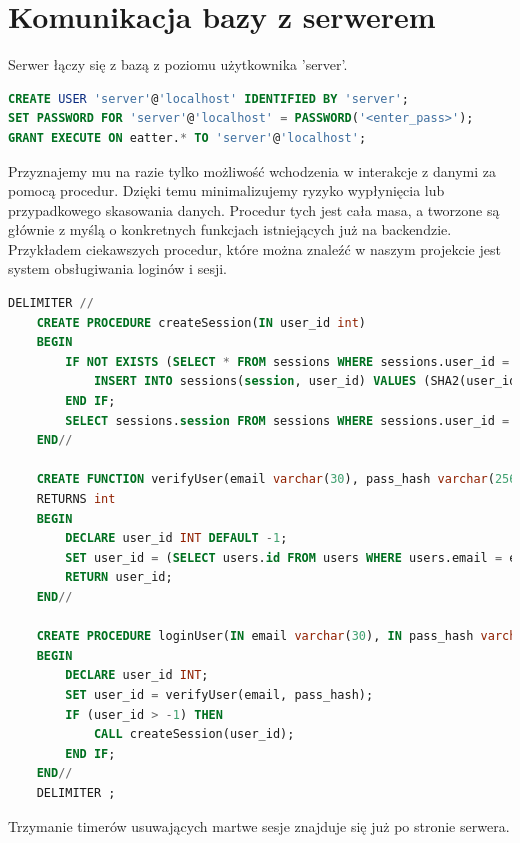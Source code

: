 \documentclass{report}
\begin{document}
\section*{Komunikacja bazy z serwerem}
Serwer łączy się z bazą z poziomu użytkownika 'server'.
\begin{lstlisting}[language=SQL]
CREATE USER 'server'@'localhost' IDENTIFIED BY 'server';
SET PASSWORD FOR 'server'@'localhost' = PASSWORD('<enter_pass>');
GRANT EXECUTE ON eatter.* TO 'server'@'localhost';
\end{lstlisting}
Przyznajemy mu na razie tylko możliwość wchodzenia w interakcje z danymi
za pomocą procedur. Dzięki temu minimalizujemy ryzyko wypłynięcia lub
przypadkowego skasowania danych. Procedur tych jest cała masa, a tworzone
są głównie z myślą o konkretnych funkcjach istniejących już na backendzie.
Przykładem ciekawszych procedur, które można znaleźć w naszym projekcie
jest system obsługiwania loginów i sesji.
\begin{lstlisting}[language=SQL]
    DELIMITER //
    CREATE PROCEDURE createSession(IN user_id int)
    BEGIN
        IF NOT EXISTS (SELECT * FROM sessions WHERE sessions.user_id = user_id) THEN
            INSERT INTO sessions(session, user_id) VALUES (SHA2(user_id, 256), user_id);
        END IF;
        SELECT sessions.session FROM sessions WHERE sessions.user_id = user_id;
    END//

    CREATE FUNCTION verifyUser(email varchar(30), pass_hash varchar(256))
    RETURNS int
    BEGIN
        DECLARE user_id INT DEFAULT -1;
        SET user_id = (SELECT users.id FROM users WHERE users.email = email AND users.pass_hash = pass_hash);
        RETURN user_id;
    END//

    CREATE PROCEDURE loginUser(IN email varchar(30), IN pass_hash varchar(256))
    BEGIN
        DECLARE user_id INT;
        SET user_id = verifyUser(email, pass_hash);
        IF (user_id > -1) THEN
            CALL createSession(user_id);
        END IF;
    END//
    DELIMITER ;
\end{lstlisting}
Trzymanie timerów usuwających martwe sesje znajduje się już po stronie
serwera.
\end{document}
